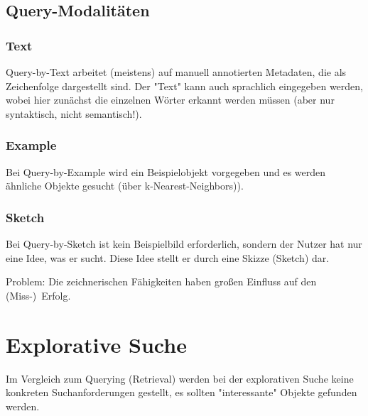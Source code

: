 			\subsection{Query-Modalitäten}
				\subsubsection{Text}
					Query-by-Text arbeitet (meistens) auf manuell annotierten Metadaten, die als Zeichenfolge dargestellt sind. Der "Text" kann auch sprachlich eingegeben werden, wobei hier zunächst die einzelnen Wörter erkannt werden müssen (aber nur syntaktisch, nicht semantisch!).

				\subsubsection{Example}
					Bei Query-by-Example wird ein Beispielobjekt vorgegeben und es werden ähnliche Objekte gesucht (\zB über k-Nearest-Neighbors)).

				\subsubsection{Sketch}
					Bei Query-by-Sketch ist kein Beispielbild erforderlich, sondern der Nutzer hat nur eine Idee, was er sucht. Diese Idee stellt er durch eine Skizze (Sketch) dar.

					Problem: Die zeichnerischen Fähigkeiten haben großen Einfluss auf den (Miss-)~Erfolg.

		\section{Explorative Suche}
			Im Vergleich zum Querying (Retrieval) werden bei der explorativen Suche keine konkreten Suchanforderungen gestellt, \dh es sollten "interessante" Objekte gefunden werden.
